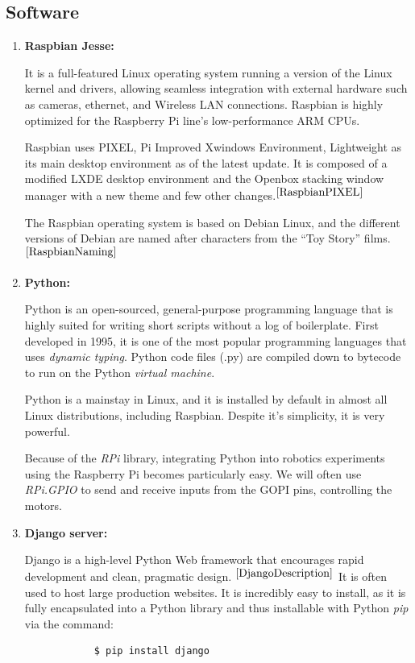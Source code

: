 	
	
	
	
	
	
	\subsection{Software}
	
	\begin{enumerate}[topsep=-2pt, itemsep=10mm]
		\item \textbf{Raspbian Jesse:} 
		
			It is a full-featured Linux operating system running a version of the Linux kernel and drivers, allowing seamless integration with external hardware such as cameras, ethernet, and Wireless LAN connections. Raspbian is highly optimized for the Raspberry Pi line's low-performance ARM CPUs.
			
			Raspbian uses PIXEL, Pi Improved Xwindows Environment, Lightweight as its main desktop environment as of the latest update. It is composed of a modified LXDE desktop environment and the Openbox stacking window manager with a new theme and few other changes.${}^{\cite{RaspbianPIXEL}}$ 
			
			The Raspbian operating system is based on Debian Linux, and the different versions of Debian are named after characters from the “Toy Story” films.${}^{\cite{RaspbianNaming}}$
		
		
		\item \textbf{Python:} 
		
		
		Python is an open-sourced, general-purpose programming language that is highly suited for writing short scripts without a log of boilerplate. First developed in 1995, it is one of the most popular programming languages that uses \textit{dynamic typing}. Python code files (.py) are compiled down to bytecode to run on the Python \textit{virtual machine}. 
		
		Python is a mainstay in Linux, and it is installed by default in almost all Linux distributions, including Raspbian. Despite it's simplicity, it is very powerful. 
		
		Because of the \textit{RPi} library, integrating Python into robotics experiments using the Raspberry Pi becomes particularly easy. We will often use \textit{RPi.GPIO} to send and receive inputs from the GOPI pins, controlling the motors. 
		
		
		\item \textbf{Django server:}
		
		Django is a high-level Python Web framework that encourages rapid development and clean, pragmatic design. ${}^{\cite{DjangoDescription}}$ It is often used to host large production websites. It is incredibly easy to install, as it is fully encapsulated into a Python library and thus installable with Python \textit{pip} via the command: 
		\begin{verbatim}  
			$ pip install django
		\end{verbatim}
		

\end{enumerate}
